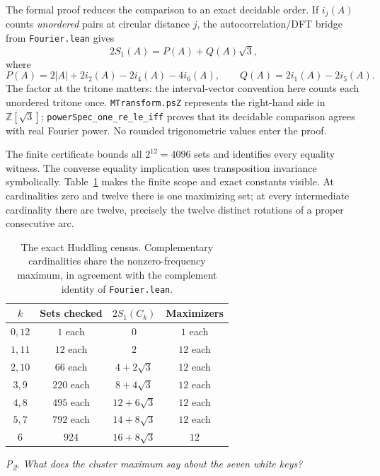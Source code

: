 \documentclass[11pt]{article}
\newcommand{\lean}[1]{\texttt{#1}}
\newcommand{\question}[1]{\smallskip\noindent\textit{#1}\smallskip}
\begin{document}
The formal proof reduces the comparison to an exact decidable order. If $i_j(A)$ counts
\emph{unordered} pairs at circular distance $j$, the autocorrelation/DFT bridge from
\lean{Fourier.lean} gives
\begin{equation}\label{eq:exact}
  2S_1(A)=P(A)+Q(A)\sqrt3,
\end{equation}
where
\[
 P(A)=2|A|+2i_2(A)-2i_4(A)-4i_6(A),\qquad
 Q(A)=2i_1(A)-2i_5(A).
\]
The factor at the tritone matters: the interval-vector convention here counts each
unordered tritone once. \lean{MTransform.psZ} represents the right-hand side in
$\mathbb Z[\sqrt3]$; \lean{powerSpec\_one\_re\_le\_iff} proves that its decidable
comparison agrees with real Fourier power. No rounded trigonometric values enter the proof.

The finite certificate bounds all $2^{12}=4096$ sets and identifies every equality witness.
The converse equality implication uses transposition invariance symbolically.
Table~\ref{tab:huddling} makes the finite scope and exact constants visible. At cardinalities
zero and twelve there is one maximizing set; at every intermediate cardinality there are
twelve, precisely the twelve distinct rotations of a proper consecutive arc.

\begin{table}[!htb]\centering
{}
\begin{tabular}{@{}cccc@{}}\toprule
\rowcolor{ctA!22}
$k$ & Sets checked & $2S_1(C_k)$ & Maximizers\\\midrule
$0,12$ & $1$ each & $0$ & $1$ each\\
$1,11$ & $12$ each & $2$ & $12$ each\\
$2,10$ & $66$ each & $4+2\sqrt3$ & $12$ each\\
$3,9$ & $220$ each & $8+4\sqrt3$ & $12$ each\\
$4,8$ & $495$ each & $12+6\sqrt3$ & $12$ each\\
$5,7$ & $792$ each & $14+8\sqrt3$ & $12$ each\\
$6$ & $924$ & $16+8\sqrt3$ & $12$\\\bottomrule
\end{tabular}
\caption{The exact Huddling census. Complementary cardinalities share the nonzero-frequency
maximum, in agreement with the complement identity of \lean{Fourier.lean}.}
\label{tab:huddling}
\end{table}

\question{P\textsubscript{2}. What does the cluster maximum say about the seven white keys?}
\end{document}
